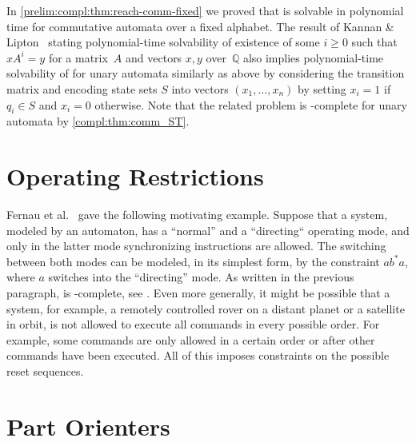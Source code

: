 \begin{remark}
	In \cref{prelim:compl:thm:reach-comm-fixed} 
	we proved that \REACHF
	is solvable in polynomial time for commutative automata over a fixed alphabet.
	The result of Kannan \& Lipton~\cite{KannanLipton1986}
	stating polynomial-time solvability 
	of existence of some $i \ge 0$
	such that $xA^i = y$ for a matrix~$A$
	and vectors $x,y$ over~$\mathbb Q$
	also implies polynomial-time solvability
	of \REACHF for unary automata
	similarly as above by considering the transition matrix and encoding state
	sets $S$ into vectors $(x_1, \ldots, x_n)$ 
	by setting $x_i = 1$ if $q_i \in S$ and $x_i = 0$ otherwise.
	Note that the related problem \ST 
	is \NP-complete for unary automata by \cref{compl:thm:comm_ST}.	
\end{remark}

\section{Operating Restrictions}%
\label{constrsync:sec:motivation:operating}

Fernau et al.~\cite{FernauGHHVW19} gave the following motivating example. Suppose that a system, modeled by an automaton, 
has a ``normal'' and a ``directing`` operating mode, and only in the latter mode
synchronizing instructions are allowed. The switching between both modes 
can be modeled, in its simplest form, 
by the constraint $ab^*a$, where $a$ switches into the ``directing'' mode.
As written in the previous paragraph,  is \NP-complete, see .
Even more generally, it might be possible that a system, for example, a remotely controlled
rover on a distant planet or a satellite in orbit, is not allowed to execute all commands in every possible
order. For example, some commands are only allowed in a certain order or after
other commands have been executed. All of this imposes constraints
on the possible reset sequences.

\section{Part Orienters}
\label{constrsync:sec:motivation:part-orienters}

